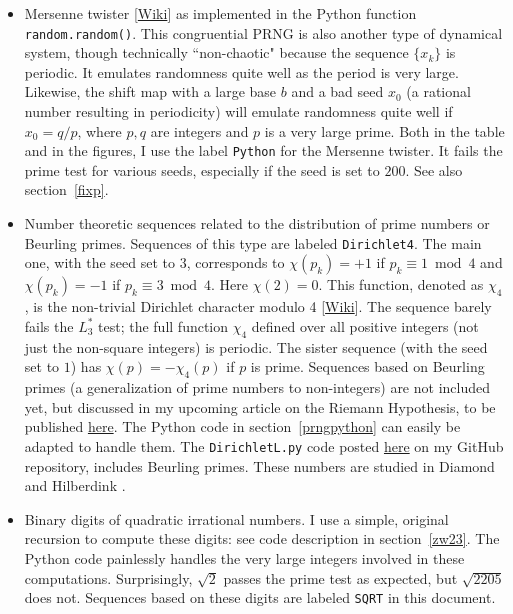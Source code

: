 \documentclass[oneside,10pt]{book}
\begin{document}
\begin{itemize}
\item \textcolor{index}{Mersenne twister} [\href{https://en.wikipedia.org/wiki/Mersenne_Twister}{Wiki}] as
 implemented in the Python function \texttt{random.random()}. This congruential PRNG is also another type of dynamical system,
 though technically ``non-chaotic" because the sequence $\{x_k\}$ 
is periodic. It emulates randomness quite well as the period is very large.
 Likewise, the shift map with a large base $b$ and a bad seed $x_0$ (a rational number resulting in periodicity) will emulate
 randomness quite well if $x_0=q/p$, where $p,q$ are integers and $p$ is a very large prime. Both in the table and in the figures, I use the label \texttt{Python} for the Mersenne twister. It fails the prime test for various seeds, especially if the seed is set to $200$. See also section~\ref{fixp}.
\item Number theoretic sequences related to the distribution of prime numbers or
 \textcolor{index}{Beurling primes}. Sequences of this type are labeled \texttt{Dirichlet4}. The main one, with the seed set to $3$, corresponds to
 $\chi(p_k)=+1$ if $p_k \equiv 1 \bmod 4$ and $\chi(p_k)=-1$ if $p_k \equiv 3\bmod 4$. Here $\chi(2)=0$. This function, denoted as $\chi_4$, is the non-trivial \textcolor{index}{Dirichlet character modulo 4} [\href{https://en.wikipedia.org/wiki/Dirichlet_character}{Wiki}]. The sequence barely fails the $L^*_3$ test; the full function $\chi_4$ defined over all positive integers (not just the non-square integers) is periodic. The sister sequence (with the seed set to $1$) has 
 $\chi(p)=-\chi_4(p)$ if $p$ is prime. Sequences based on Beurling primes (a generalization of prime numbers to non-integers) are not included yet, but discussed in my upcoming article on the Riemann Hypothesis, to be published \href{https://mltechniques.com/resources/}{here}. The Python code 
in section~\ref{prngpython} can easily be adapted to handle them. The \texttt{DirichletL.py} code posted 
 \href{https://github.com/VincentGranville/Experimental-Math-Number-Theory/blob/main/Source-Code/dirichletL.py}{here} on my GitHub repository, includes Beurling primes.  These numbers are studied in 
 Diamond \cite{wen2016} and Hilberdink  \cite{bzf2004}.
\item Binary digits of \textcolor{index}{quadratic irrational} numbers. I use a simple, original recursion to compute these 
digits: see code description in section~\ref{zw23}. The Python code painlessly handles the very large integers involved in these computations. Surprisingly, $\sqrt{2}$ passes the prime test as expected, but $\sqrt{2205}$ does not. Sequences based on these digits are labeled \texttt{SQRT} in this document.
\end{itemize}
\end{document}
